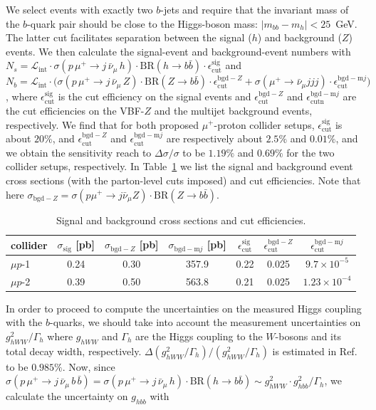 \documentclass[a4paper,11pt]{article}
\begin{document}
We select events with exactly two $b$-jets and require that the invariant mass of the $b$-quark pair should be close to the Higgs-boson mass: $|m_{bb}-m_h|<25$~GeV.
The latter cut facilitates separation between the signal ($h$) and background ($Z$) events.
We then calculate the signal-event and background-event numbers with $N_s=\mathcal{L}_{\text{int}}\cdot\sigma(p\,\mu^+\to j \,\bar{\nu}_\mu\,h)\cdot \text{BR}(h\to b\bar{b})\cdot \epsilon^{\text{sig}}_{\text{cut}}$ and $N_b=\mathcal{L}_{\text{int}}\cdot\Big(\sigma(p\,\mu^+\to j \,\bar{\nu}_\mu\,Z)\cdot \text{BR}(Z\to b\bar{b})\cdot \epsilon^{\text{bgd}-Z}_{\text{cut}}+ \sigma(\mu^+\to \bar{\nu}_\mu j j j )\cdot \epsilon_{\text{cut}}^{\text{bgd}-\text{m}j}\Big)$, where $\epsilon^{\text{sig}}_{\text{cut}}$ is the cut efficiency on the signal events and $\epsilon^{\text{bgd}-Z}_{\text{cut}}$ and $ \epsilon_{\text{cutn}}^{\text{bgd}-\text{m}j}$ are the cut efficiencies on the VBF-$Z$ and the multijet background events, respectively.
We find that for both proposed $\mu^+$-proton collider setups, $\epsilon^{\text{sig}}_{\text{cut}}$ is about $20\%$, and $\epsilon^{\text{bgd}-Z}_{\text{cut}}$ and $\epsilon_{\text{cut}}^{\text{bgd}-\text{m}j}$ are respectively about $2.5\%$ and $0.01\%$, and we obtain the sensitivity reach to $\Delta\sigma/\sigma$ to be $1.19\%$ and $0.69\%$ for the two collider setups, respectively.
In Table~\ref{tab:hbb} we list the signal and background event cross sections (with the parton-level cuts imposed) and cut efficiencies.
Note that here $\sigma_{\text{bgd}-Z}=\sigma(p\mu^+\to j \bar{\nu}_\mu Z)\cdot \text{BR}(Z\to b\bar{b})$. 

\begin{table}[htbp]
\centering
\begin{tabular}{lcccccc}
\hline
collider &  $\sigma_\text{sig}$ [pb] & $\sigma_{\text{bgd}-Z}$ [pb]  & $\sigma_{\text{bgd}-\text{m}j}$ [pb]  &  $\epsilon^{\text{sig}}_{\text{cut}}$    &  $\epsilon^{\text{bgd}-Z}_{\text{cut}}$  & $\epsilon^{\text{bgd}-\text{m}j}_{\text{cut}}$ \\
\hline 
$\mu p$-1 & 0.24 &  0.30 &  357.9 & 0.22  &0.025  & $9.7\times 10^{-5}$  \\
$\mu p$-2 & 0.39 & 0.50 &  563.8 & 0.21  & 0.025 &  $1.23\times 10^{-4}$ \\
\hline
\end{tabular}
\caption{Signal and background cross sections and cut efficiencies.}
\label{tab:hbb}
\end{table}


In order to proceed to compute the uncertainties on the measured Higgs coupling with the $b$-quarks, we should take into account the measurement uncertainties on $g_{hWW}^2/\Gamma_h$ where $g_{hWW}$ and $\Gamma_h$ are the Higgs coupling to the $W$-bosons and its total decay width, respectively.
$\Delta\left({g_{hWW}^2}/{\Gamma_h}\right)/\left({g^2_{hWW}}/{\Gamma_h}\right)$ is estimated in Ref.~\cite{Cheung:2021iev} to be $0.985\%$.
Now, since $\sigma(p\,\mu^+\to j \, \bar{\nu}_{\mu}\, b\, \bar{b})=\sigma(p\,\mu^+\to j \, \bar{\nu}_{\mu}\, h)\cdot \text{BR}(h\to b\bar{b})\sim{g^2_{hWW}\cdot g^2_{hbb}}/{\Gamma_h}$, we calculate the uncertainty on $g_{hbb}$ with 
\end{document}
